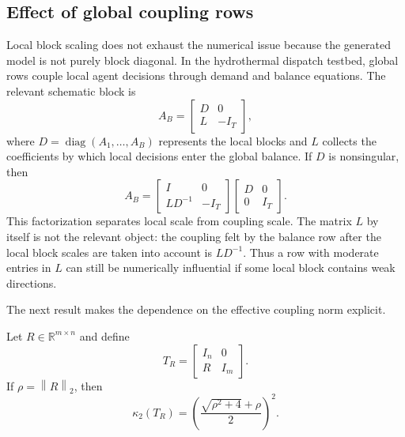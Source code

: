 \documentclass[AMA,Times1COL]{WileyNJDv5} %
\newcommand{\R}{\mathbb{R}}
\newcommand{\diag}{\operatorname{diag}}
\newcommand{\norm}[1]{\left\lVert #1 \right\rVert}
\begin{document}
\subsection{Effect of global coupling rows}
\label{subsec:global-coupling-theory}

Local block scaling does not exhaust the numerical issue because the generated model is
not purely block diagonal. In the hydrothermal dispatch testbed, global rows couple local
agent decisions through demand and balance equations. The relevant schematic block is
\begin{equation}
A_B=
\begin{bmatrix}
D & 0\\
L & -I_T
\end{bmatrix},
\label{eq:balance-block-matrix}
\end{equation}
where $D=\diag(A_1,\ldots,A_B)$ represents the local blocks and $L$ collects the
coefficients by which local decisions enter the global balance. If $D$ is nonsingular, then
\begin{equation}
A_B=
\begin{bmatrix}
I & 0\\
LD^{-1} & -I_T
\end{bmatrix}
\begin{bmatrix}
D & 0\\
0 & I_T
\end{bmatrix}.
\label{eq:balance-factorization}
\end{equation}
This factorization separates local scale from coupling scale. The matrix $L$ by itself is
not the relevant object: the coupling felt by the balance row after the local block scales
are taken into account is $LD^{-1}$. Thus a row with moderate entries in $L$ can still be
numerically influential if some local block contains weak directions.

The next result makes the dependence on the effective coupling norm explicit.

\begin{proposition}
\label{prop:triangular-coupling}
Let $R\in\R^{m\times n}$ and define
\begin{equation}
T_R=
\begin{bmatrix}
I_n & 0\\
R & I_m
\end{bmatrix}.
\end{equation}
If $\rho=\norm{R}_2$, then
\begin{equation}
\kappa_2(T_R)=
\left(\frac{\sqrt{\rho^2+4}+\rho}{2}\right)^2 .
\label{eq:link-condition}
\end{equation}
\end{proposition}
\end{document}
